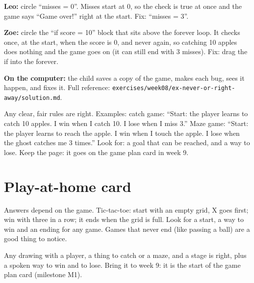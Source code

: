 \begin{answer}
\textbf{Leo:} circle \enquote{misses = 0}. Misses start at 0, so the check is true at once and the game says \enquote{Game over!} right at the start. Fix: \enquote{misses = 3}.

\textbf{Zoe:} circle the \enquote{if score = 10} block that sits above the forever loop. It checks once, at the start, when the score is 0, and never again, so catching 10 apples does nothing and the game goes on (it can still end with 3 misses). Fix: drag the if into the forever.

\textbf{On the computer:} the child saves a copy of the game, makes each bug, sees it happen, and fixes it. Full reference: \texttt{exercises/week08/ex-never-or-right-away/solution.md}.
\end{answer}

\begin{answer}
Any clear, fair rules are right. Examples: catch game: \enquote{Start: the player learns to catch 10 apples. I win when I catch 10. I lose when I miss 3.} Maze game: \enquote{Start: the player learns to reach the apple. I win when I touch the apple. I lose when the ghost catches me 3 times.} Look for: a goal that can be reached, and a way to lose. Keep the page: it goes on the game plan card in week 9.
\end{answer}

\section{Play-at-home card}
\begin{answer}
Answers depend on the game. Tic-tac-toe: start with an empty grid, X goes first; win with three in a row; it ends when the grid is full. Look for a start, a way to win and an ending for any game. Games that never end (like passing a ball) are a good thing to notice.
\end{answer}

\begin{answer}
Any drawing with a player, a thing to catch or a maze, and a stage is right, plus a spoken way to win and to lose. Bring it to week 9: it is the start of the game plan card (milestone M1).
\end{answer}
